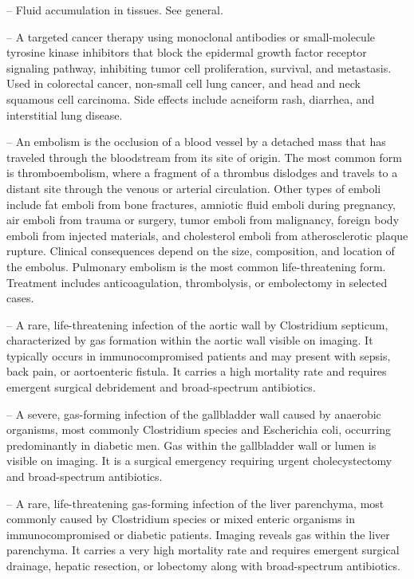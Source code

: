 -- Fluid accumulation in tissues. See general.

-- A targeted cancer therapy using monoclonal antibodies or small-molecule tyrosine kinase inhibitors that block the epidermal growth factor receptor signaling pathway, inhibiting tumor cell proliferation, survival, and metastasis. Used in colorectal cancer, non-small cell lung cancer, and head and neck squamous cell carcinoma. Side effects include acneiform rash, diarrhea, and interstitial lung disease.

-- An embolism is the occlusion of a blood vessel by a detached mass that has traveled through the bloodstream from its site of origin. The most common form is thromboembolism, where a fragment of a thrombus dislodges and travels to a distant site through the venous or arterial circulation. Other types of emboli include fat emboli from bone fractures, amniotic fluid emboli during pregnancy, air emboli from trauma or surgery, tumor emboli from malignancy, foreign body emboli from injected materials, and cholesterol emboli from atherosclerotic plaque rupture. Clinical consequences depend on the size, composition, and location of the embolus. Pulmonary embolism is the most common life-threatening form. Treatment includes anticoagulation, thrombolysis, or embolectomy in selected cases.

-- A rare, life-threatening infection of the aortic wall by Clostridium septicum, characterized by gas formation within the aortic wall visible on imaging. It typically occurs in immunocompromised patients and may present with sepsis, back pain, or aortoenteric fistula. It carries a high mortality rate and requires emergent surgical debridement and broad-spectrum antibiotics.

-- A severe, gas-forming infection of the gallbladder wall caused by anaerobic organisms, most commonly Clostridium species and Escherichia coli, occurring predominantly in diabetic men. Gas within the gallbladder wall or lumen is visible on imaging. It is a surgical emergency requiring urgent cholecystectomy and broad-spectrum antibiotics.

-- A rare, life-threatening gas-forming infection of the liver parenchyma, most commonly caused by Clostridium species or mixed enteric organisms in immunocompromised or diabetic patients. Imaging reveals gas within the liver parenchyma. It carries a very high mortality rate and requires emergent surgical drainage, hepatic resection, or lobectomy along with broad-spectrum antibiotics.

